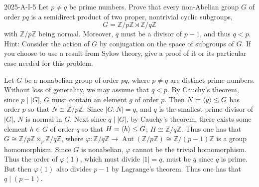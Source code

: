 \documentclass{article}
\begin{document}
	\begin{prb}{2025-A-I-5}
		Let $p \neq q$ be prime numbers. Prove that every non-Abelian group $G$ of order $pq$ is a semidirect product of two proper, nontrivial cyclic subgroups, 
		\begin{equation*}
			G = \mathbb{Z}/p\mathbb{Z} \rtimes \mathbb{Z}/q\mathbb{Z}
		\end{equation*}
		with $\mathbb{Z}/p\mathbb{Z}$ being normal. Moreover, $q$ must be a divisor of $p - 1$, and thus $q < p$. Hint: Consider the action of $G$ by conjugation on the space of subgroups of $G$. If you choose to use a result from Sylow theory, give a proof of it or its particular case needed for this problem. 
	\end{prb}
	Let  $G$ be a nonabelian group of order $pq$, where $p \neq q$ are distinct prime numbers. Without loss of generality, we may assume that $q < p$. By Cauchy's theorem, since $p \mid |G|$, $G$ must contain an element $g$ of order $p$. Then $N = \braket{g} \leq G$ has order $p$ so that $N \cong \mathbb{Z}/p\mathbb{Z}$. Since $|G: N| = q$, and $q$ is the smallest prime divisor of $|G|$, $N$ is normal in $G$. Next since $q \mid |G|$, by Cauchy's theorem, there exists some element $h \in G$ of order $q$ so that $H = \braket{h} \leq G$; $H \cong \mathbb{Z}/q\mathbb{Z}$. Thus one has that $G \cong \mathbb{Z}/p\mathbb{Z} \rtimes_{\varphi} \mathbb{Z}/q\mathbb{Z}$, where $\varphi: \mathbb{Z}/q\mathbb{Z} \to \operatorname{Aut}(\mathbb{Z}/p\mathbb{Z}) \cong \mathbb{Z}/(p - 1)\mathbb{Z}$ is a group homomorphism. Since $G$ is nonabelian, $\varphi$ cannot be the trivial homomorphism. Thus the order of $\varphi(1)$, which must divide $|1| = q$, must be $q$ since $q$ is prime. But then $\varphi(1)$ also divides $p - 1$ by Lagrange's theorem. Thus one has that $q \mid (p - 1)$. 
	
\end{document}
